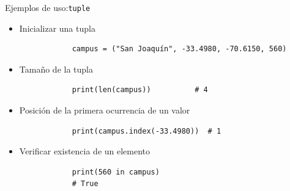 \documentclass{beamer}
\begin{document}
    \begin{frame}[fragile, t]{Ejemplos de uso:\texttt{tuple}}
        \begin{itemize}
            \item Inicializar una tupla
            \begin{verbatim}
            campus = ("San Joaquín", -33.4980, -70.6150, 560)
            \end{verbatim}
            \item Tamaño de la tupla
            \begin{verbatim} 
            print(len(campus))          # 4
            \end{verbatim}
            \item Posición de la primera ocurrencia de un valor
            \begin{verbatim}
            print(campus.index(-33.4980))  # 1
            \end{verbatim}
            \item Verificar existencia de un elemento
            \begin{verbatim}
            print(560 in campus)
            # True
            \end{verbatim}
        \end{itemize}
    \end{frame}
\end{document}
